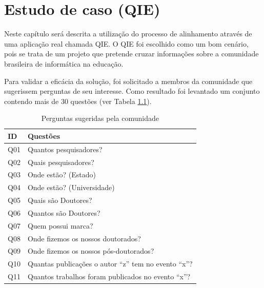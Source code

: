 \chapter{Estudo de caso (QIE)}
Neste capítulo será descrita a utilização do processo de alinhamento através de uma aplicação real chamada QIE. O QIE foi escolhido como um bom cenário, pois se trata de um projeto que pretende cruzar informações sobre a comunidade brasileira de informática na educação.

Para validar a eficácia da solução, foi solicitado a membros da comunidade que sugerissem perguntas de seu interesse. Como resultado foi levantado um conjunto contendo mais de 30 questões (ver Tabela \ref{tab:questions}).

\begin{table}[!ht]
\centering
\caption{Perguntas sugeridas pela comunidade}
\label{tab:questions}
\begin{tabular}{|l|l|}
\hline
ID  & Questões                                                                          \\ \hline
Q01 & Quantos pesquisadores?                                                            \\ \hline
Q02 & Quais pesquisadores?                                                              \\ \hline
Q03 & Onde estão? (Estado)                                                              \\ \hline
Q04 & Onde estão? (Universidade)                                                        \\ \hline
Q05 & Quais são Doutores?                                                               \\ \hline
Q06 & Quantos são Doutores?                                                             \\ \hline
Q07 & Quem possui marca?                                                                \\ \hline
Q08 & Onde fizemos os nossos doutorados?                                                \\ \hline
Q09 & Onde fizemos os nossos pós-doutorados?                                            \\ \hline
Q10 & Quantas publicações o autor “z” tem no evento “x”?                                \\ \hline
Q11 & Quantos trabalhos foram publicados no evento “x”?                                 \\ \hline

\end{tabular}
\end{table}
